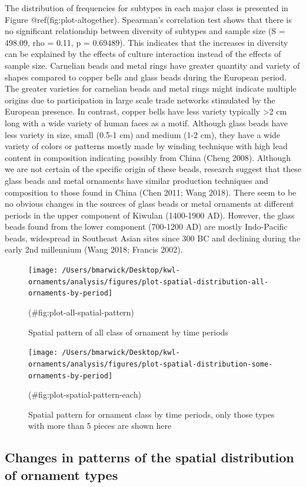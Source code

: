 \documentclass[]{article}
\begin{document}
The distribution of frequencies for subtypes in each major class is
presented in Figure @ref(fig:plot-altogether). Spearman's correlation
test shows that there is no significant relationship between diversity
of subtypes and sample size (S = 498.09, rho = 0.11, p = \(0.69489\)).
This indicates that the increases in diversity can be explained by the
effects of culture interaction instead of the effects of sample size.
Carnelian beads and metal rings have greater quantity and variety of
shapes compared to copper bells and glass beads during the European
period. The greater varieties for carnelian beads and metal rings might
indicate multiple origins due to participation in large scale trade
networks stimulated by the European presence. In contrast, copper bells
have less variety typically \textgreater2 cm long with a wide variety of
human faces as a motif. Although glass beads have less variety in size,
small (0.5-1 cm) and medium (1-2 cm), they have a wide variety of colors
or patterns mostly made by winding technique with high lead content in
composition indicating possibly from China (Cheng 2008). Although we are
not certain of the specific origin of these beads, research suggest that
these glass beads and metal ornaments have similar production techniques
and composition to those found in China (Chen 2011; Wang 2018). There
seem to be no obvious changes in the sources of glass beads or metal
ornaments at different periods in the upper component of Kiwulan
(1400-1900 AD). However, the glass beads found from the lower component
(700-1200 AD) are mostly Indo-Pacific beads, widespread in Southeast
Asian sites since 300 BC and declining during the early 2nd millennium
(Wang 2018; Francis 2002).

\begin{figure}
\texttt{[image: /Users/bmarwick/Desktop/kwl-ornaments/analysis/figures/plot-spatial-distribution-all-ornaments-by-period]} \caption{Spatial pattern of all class of ornament by time periods}(\#fig:plot-all-spatial-pattern)
\end{figure}

\begin{figure}
\texttt{[image: /Users/bmarwick/Desktop/kwl-ornaments/analysis/figures/plot-spatial-distribution-some-ornaments-by-period]} \caption{Spatial pattern for ornament class by time periods, only those types with more than 5 pieces are shown here}(\#fig:plot-spatial-pattern-each)
\end{figure}

\hypertarget{changes-in-patterns-of-the-spatial-distribution-of-ornament-types}{%
\subsection{Changes in patterns of the spatial distribution of ornament
types}\label{changes-in-patterns-of-the-spatial-distribution-of-ornament-types}}
\end{document}
